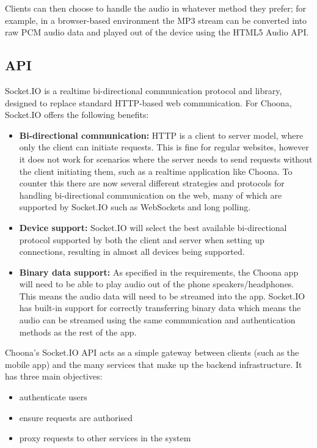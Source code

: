 Clients can then choose to handle the audio in whatever method they prefer; for example, in a browser-based environment the MP3 stream can be converted into raw PCM audio data and played out of the device using the HTML5 Audio API.


\subsection{API}

Socket.IO is a realtime bi-directional communication protocol and library, designed to replace standard HTTP-based web communication. For Choona, Socket.IO offers the following benefits:

\begin{itemize}
  \item \textbf{Bi-directional communication:} HTTP is a client to server model, where only the client can initiate requests. This is fine for regular websites, however it does not work for scenarios where the server needs to send requests without the client initiating them, such as a realtime application like Choona. To counter this there are now several different strategies and protocols for handling bi-directional communication on the web, many of which are supported by Socket.IO such as WebSockets and long polling.
  \item \textbf{Device support:} Socket.IO will select the best available bi-directional protocol supported by both the client and server when setting up connections, resulting in almost all devices being supported.
  \item \textbf{Binary data support:} As specified in the requirements, the Choona app will need to be able to play audio out of the phone speakers/headphones. This means the audio data will need to be streamed into the app. Socket.IO has built-in support for correctly transferring binary data which means the audio can be streamed using the same communication and authentication methods as the rest of the app.
\end{itemize}

Choona's Socket.IO API acts as a simple gateway between clients (such as the mobile app) and the many services that make up the backend infrastructure. It has three main objectives:

\begin{itemize}
  \item authenticate users
  \item ensure requests are authorised
  \item proxy requests to other services in the system
\end{itemize}

